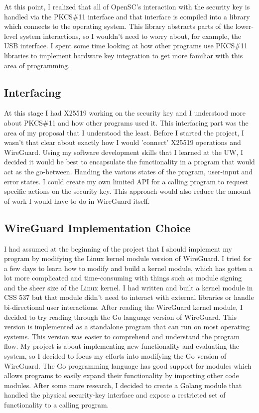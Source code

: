 \documentclass [11pt, proquest] {uwthesis}[2020/02/24]
\begin{document}
At this point, I realized that all of OpenSC's interaction with the security key is handled via the PKCS\#11 interface and that interface is compiled into a library which connects to the operating system. This library abstracts parts of the lower-level system interactions, so I wouldn't need to worry about, for example, the USB interface. I spent some time looking at how other programs use PKCS\#11 libraries to implement hardware key integration to get more familiar with this area of programming.

\subsection{Interfacing}
At this stage I had X25519 working on the security key and I understood more about PKCS\#11 and how other programs used it. This interfacing part was the area of my proposal that I understood the least. Before I started the project, I wasn't that clear about exactly how I would 'connect' X25519 operations and WireGuard. Using my software development skills that I learned at the UW, I decided it would be best to encapsulate the functionality in a program that would act as the go-between. Handing the various states of the program, user-input and error states. I could create my own limited API for a calling program to request specific actions on the security key. This approach would also reduce the amount of work I would have to do in WireGuard itself.

\subsection{WireGuard Implementation Choice}
I had assumed at the beginning of the project that I should implement my program by modifying the Linux kernel module version of WireGuard. I tried for a few days to learn how to modify and build a kernel module, which has gotten a lot more complicated and time-consuming with things such as module signing and the sheer size of the Linux kernel. I had written and built a kernel module in CSS 537 but that module didn't need to interact with external libraries or handle bi-directional user interactions. After reading the WireGuard kernel module, I decided to try reading through the Go language version of WireGuard. This version is implemented as a standalone program that can run on most operating systems. This version was easier to comprehend and understand the program flow. My project is about implementing new functionality and evaluating the system, so I decided to focus my efforts into modifying the Go version of WireGuard.
The Go programming language has good support for modules which allows programs to easily expand their functionality by importing other code modules. After some more research, I decided to create a Golang module that handled the physical security-key interface and expose a restricted set of functionality to a calling program. 
\end{document}
